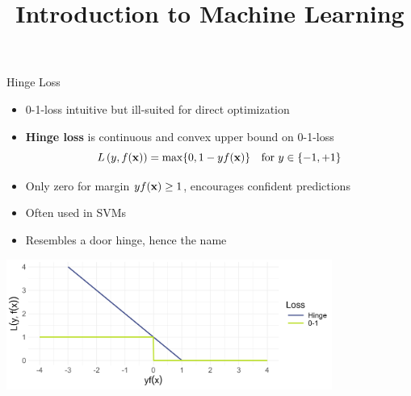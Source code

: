\documentclass[11pt,compress,t,notes=noshow, xcolor=table]{beamer}
\title{Introduction to Machine Learning}
\begin{document}
    

\begin{vbframe}{Hinge Loss}

\begin{itemize}
  \item 0-1-loss intuitive but ill-suited for direct optimization
  \item \textbf{Hinge loss} is continuous and convex 
  upper bound on 0-1-loss 
  $$L\left(y, f(\mathbf{x})\right) = \max \{ 0, 1 - yf(\mathbf{x}) \} \quad \text{for} \ y \in \{-1, +1\}$$
  \item Only zero for margin $yf(\mathbf{x})\geq 1$, 
  encourages confident predictions
  \item Often used in SVMs %
  \item Resembles a door hinge, hence the name
\end{itemize}

\begin{center}
\includegraphics[width = 0.8\textwidth]{figure/overview_classif_subset1.png}
\end{center}

\end{vbframe}
\end{document}

